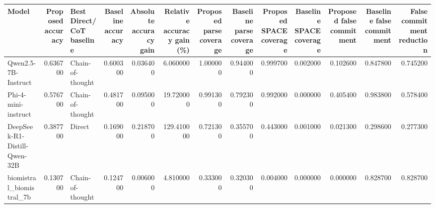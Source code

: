 \begin{tabular}{lrlrrrrrrrrrr}
\toprule
Model & Proposed accuracy & Best Direct/CoT baseline & Baseline accuracy & Absolute accuracy gain & Relative accuracy gain (\%) & Proposed parse coverage & Baseline parse coverage & Proposed SPACE coverage & Baseline SPACE coverage & Proposed false commitment & Baseline false commitment & False commitment reduction \\
\midrule
Qwen2.5-7B-Instruct & 0.636700 & Chain-of-thought & 0.600300 & 0.036400 & 6.060000 & 1.000000 & 0.944000 & 0.999700 & 0.002000 & 0.102600 & 0.847800 & 0.745200 \\
Phi-4-mini-instruct & 0.576700 & Chain-of-thought & 0.481700 & 0.095000 & 19.720000 & 0.991300 & 0.792300 & 0.992000 & 0.000000 & 0.405400 & 0.983800 & 0.578400 \\
DeepSeek-R1-Distill-Qwen-32B & 0.387700 & Direct & 0.169000 & 0.218700 & 129.410000 & 0.721300 & 0.355700 & 0.443000 & 0.001000 & 0.021300 & 0.298600 & 0.277300 \\
biomistral\_biomistral\_7b & 0.130700 & Chain-of-thought & 0.124700 & 0.006000 & 4.810000 & 0.333000 & 0.320300 & 0.004000 & 0.000000 & 0.000000 & 0.828700 & 0.828700 \\
\bottomrule
\end{tabular}
